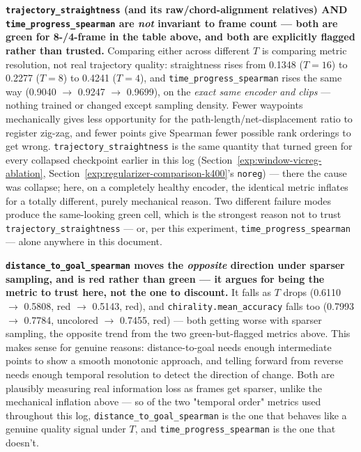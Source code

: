 \textbf{\texttt{trajectory\_straightness} (and its raw/chord-alignment relatives) AND
\texttt{time\_progress\_spearman} are \emph{not} invariant to frame count --- both are
green for 8-/4-frame in the table above, and both are explicitly flagged rather than
trusted.} Comparing either across different $T$ is comparing metric resolution, not real
trajectory quality: straightness rises from 0.1348 ($T{=}16$) to 0.2277 ($T{=}8$) to
0.4241 ($T{=}4$), and \texttt{time\_progress\_spearman} rises the same way (0.9040 $\to$
0.9247 $\to$ 0.9699), on the \emph{exact same encoder and clips} --- nothing trained or
changed except sampling density. Fewer waypoints mechanically gives less opportunity for
the path-length/net-displacement ratio to register zig-zag, and fewer points give
Spearman fewer possible rank orderings to get wrong. \texttt{trajectory\_straightness} is
the same quantity that turned green for every collapsed checkpoint earlier in this log
(Section~\ref{exp:window-vicreg-ablation}, Section~\ref{exp:regularizer-comparison-k400}'s
\texttt{noreg}) --- there the cause was collapse; here, on a completely healthy encoder,
the identical metric inflates for a totally different, purely mechanical reason. Two
different failure modes produce the same-looking green cell, which is the strongest
reason not to trust \texttt{trajectory\_straightness} --- or, per this experiment,
\texttt{time\_progress\_spearman} --- alone anywhere in this document.

\textbf{\texttt{distance\_to\_goal\_spearman} moves the \emph{opposite} direction under
sparser sampling, and is red rather than green --- it argues for being the metric to
trust here, not the one to discount.} It falls as $T$ drops (0.6110 $\to$ 0.5808, red
$\to$ 0.5143, red), and \texttt{chirality.mean\_accuracy} falls too (0.7993 $\to$ 0.7784,
uncolored $\to$ 0.7455, red) --- both getting worse with sparser sampling, the opposite
trend from the two green-but-flagged metrics above. This makes sense for genuine reasons:
distance-to-goal needs enough intermediate points to show a smooth monotonic approach,
and telling forward from reverse needs enough temporal resolution to detect the
direction of change. Both are plausibly measuring real information loss as frames get
sparser, unlike the mechanical inflation above --- so of the two "temporal order"
metrics used throughout this log, \texttt{distance\_to\_goal\_spearman} is the one that
behaves like a genuine quality signal under $T$, and \texttt{time\_progress\_spearman} is
the one that doesn't.

